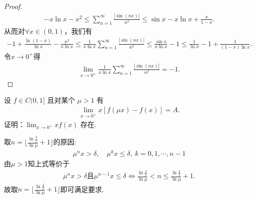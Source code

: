 \documentclass[../../main.tex]{subfiles}
\begin{document}
\begin{proof}
\begin{align*}
-x\ln x-x^2\leqslant \sum_{n=1}^{\infty}\frac{|\sin(nx)|}{n^2}\leqslant \sin x-x\ln x+\frac{x}{1-x}.
\end{align*}
从而对$\forall x\in (0,1)$，我们有
\begin{align*}
-1+\frac{\ln \left( 1-x \right)}{\ln x}-\frac{x^2}{x\ln x} \leqslant \frac{1}{x\ln x}\sum_{n=1}^{\infty}\frac{|\sin(nx)|}{n^2}\leqslant \frac{\sin x}{x\ln x}-1\leqslant \frac{1}{\ln x}-1+\frac{1}{(1-x)\ln x}.
\end{align*}
令$x\rightarrow 0^+$得
\begin{align*}
\lim_{x\rightarrow 0^+}\frac{1}{x\ln x}\sum_{n=1}^{\infty}\frac{|\sin(nx)|}{n^2}=-1.
\end{align*}

\end{proof}

\begin{example}
设 $f \in C(0,1]$ 且对某个 $\mu > 1$ 有
\begin{align*}
\lim_{x \to 0^+} x[f(\mu x) - f(x)] = A.
\end{align*}
证明：$\lim_{x \to 0^+} x f(x)$ 存在.
\end{example}
\begin{note}
取$n=\lfloor \frac{\ln \frac{\delta}{x}}{\ln \mu} + 1 \rfloor$的原因:
\begin{align*}
\mu^n x > \delta, \quad \mu^k x \leq \delta, \ k=0,1,\cdots,n-1
\end{align*}
由$\mu > 1$知上式等价于
\begin{align*}
\mu^n x > \delta \text{且}\mu^{n-1} x \leqslant \delta \Longleftrightarrow \frac{\ln \frac{\delta}{x}}{\ln \mu} < n \leqslant \frac{\ln \frac{\delta}{x}}{\ln \mu} + 1.
\end{align*}
故取$n=\lfloor \frac{\ln \frac{\delta}{x}}{\ln \mu} + 1 \rfloor$即可满足要求.
\end{note}
\end{document}
